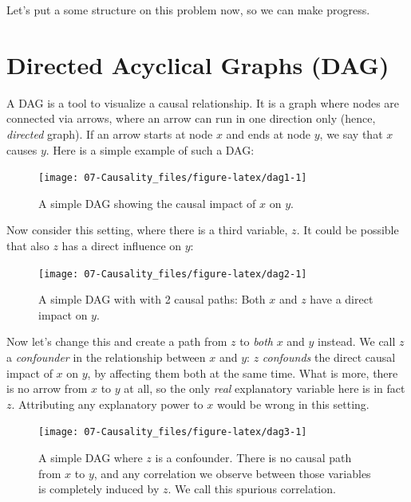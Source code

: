 \documentclass[]{book}
\begin{document}
Let's put a some structure on this problem now, so we can make progress.

\section{Directed Acyclical Graphs (DAG)}\label{dags}

A DAG is a tool to visualize a causal relationship. It is a graph where
nodes are connected via arrows, where an arrow can run in one direction
only (hence, \emph{directed} graph). If an arrow starts at node \(x\)
and ends at node \(y\), we say that \(x\) causes \(y\). Here is a simple
example of such a DAG:

\begin{figure}

{\centering \texttt{[image: 07-Causality\_files/figure-latex/dag1-1]} 

}

\caption{A simple DAG showing the causal impact of $x$ on $y$.}\label{fig:dag1}
\end{figure}

Now consider this setting, where there is a third variable, \(z\). It
could be possible that also \(z\) has a direct influence on \(y\):

\begin{figure}

{\centering \texttt{[image: 07-Causality\_files/figure-latex/dag2-1]} 

}

\caption{A simple DAG with with 2 causal paths: Both $x$ and $z$ have a direct impact on $y$.}\label{fig:dag2}
\end{figure}

Now let's change this and create a path from \(z\) to \emph{both} \(x\)
and \(y\) instead. We call \(z\) a \emph{confounder} in the relationship
between \(x\) and \(y\): \(z\) \emph{confounds} the direct causal impact
of \(x\) on \(y\), by affecting them both at the same time. What is
more, there is no arrow from \(x\) to \(y\) at all, so the only
\emph{real} explanatory variable here is in fact \(z\). Attributing any
explanatory power to \(x\) would be wrong in this setting.

\begin{figure}

{\centering \texttt{[image: 07-Causality\_files/figure-latex/dag3-1]} 

}

\caption{A simple DAG where $z$ is a confounder. There is no causal path from $x$ to $y$, and any correlation we observe between those variables is completely induced by $z$. We call this spurious correlation.}\label{fig:dag3}
\end{figure}
\end{document}
